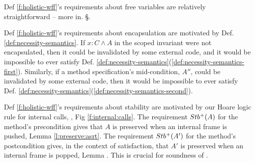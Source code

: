 {\begin{definition}
\end{definition}

Def \ref{f:holistic-wff}'s  requirements about  free variables are relatively straightforward -- more  in. \S {}.

Def \ref{f:holistic-wff}'s  requirements about encapsulation are motivated by  Def.   \ref{def:necessity-semantics}. If  $\overline {x:C}\wedge A$ in the scoped invariant  were not encapsulated,  then it could be invalidated by some external code, and it would be impossible to ever satisfy Def.   \ref{def:necessity-semantics}(\ref{def:necessity-semantics-first}). 
Similarly, if a method specification's mid-condition, $A''$, could be invalidated by some external code, then it would be impossible to ever satisfy Def.   \ref{def:necessity-semantics}(\ref{def:necessity-semantics-second}). 


Def \ref{f:holistic-wff}'s  requirements about stability are motivated by our Hoare logic rule for internal calls,   {}, Fig \ref{f:internal:calls}. The requirement    ${Stb^+( A )}$ for the method's precondition  gives that $A$ is preserved when an internal frame is pushed, \cf Lemma \ref{l:preserve:asrt}.
The requirement     ${Stb^+( A' )}$ for the method's postcondition gives,  in the context of \strong satisfaction,  that $A'$ is preserved when an internal frame is popped, \cf Lemma . This is crucial for soundness of  {}.




}
